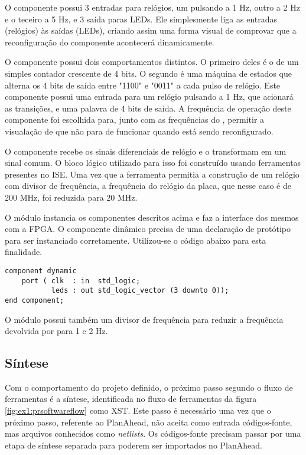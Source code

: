 \documentclass[11pt,a4paper,oneside]{book}
\begin{document}
O componente  possui 3 entradas para relógios, um pulsando a 1 Hz, outro a 2 Hz e o teceiro a 5 Hz, e 3 saída paras LEDs.
Ele simplesmente liga as entradas (relógios) às saídas (LEDs), criando assim uma forma visual de comprovar que a reconfiguração do componente  acontecerá dinamicamente.

O componente  possui dois comportamentos distintos.
O primeiro deles é o de um simples contador crescente de 4 bits.
O segundo é uma máquina de estados que alterna os 4 bits de saída entre "1100" e "0011" a cada pulso de relógio.
Este componente possui uma entrada para um relógio pulsando a 1 Hz, que acionará as transições, e uma palavra de 4 bits de saída.
A frequência de operação deste componente foi escolhida para, junto com as frequências do , permitir a visualação de que  não para de funcionar quando  está sendo reconfigurado.

O componente  recebe os sinais diferenciais de relógio e o transformam em um sinal comum.
O bloco lógico utilizado para isso foi construído usando ferramentas presentes no ISE.
Uma vez que a ferramenta permitia a construção de um relógio com divisor de frequência, a frequência do relógio da placa, que nesse caso é de 200 MHz, foi reduzida para 20 MHz.

O módulo  instancia os componentes descritos acima e faz a interface dos mesmos com a FPGA.
O componente dinâmico precisa de uma declaração de protótipo para ser instanciado corretamente.
Utilizou-se o código abaixo para esta finalidade.
\begin{lstlisting}[style=customVHDL]
component dynamic
    port ( clk  : in  std_logic;
           leds : out std_logic_vector (3 downto 0));
end component;
\end{lstlisting}
O módulo  possui também um divisor de frequência para reduzir a frequência devolvida por  para 1 e 2 Hz.

\subsection{Síntese}
Com o comportamento do projeto definido, o próximo passo segundo o fluxo de ferramentas é a síntese, identificada no fluxo de ferramentas da figura \ref{fig:ex1:prsoftwareflow} como XST.
Este passo é necessário uma vez que o próximo passo, referente ao PlanAhead, não aceita como entrada códigos-fonte, mas arquivos conhecidos como \textit{netlists}.
Os códigos-fonte precisam passar por uma etapa de síntese separada para poderem ser importados no PlanAhead.
\end{document}
